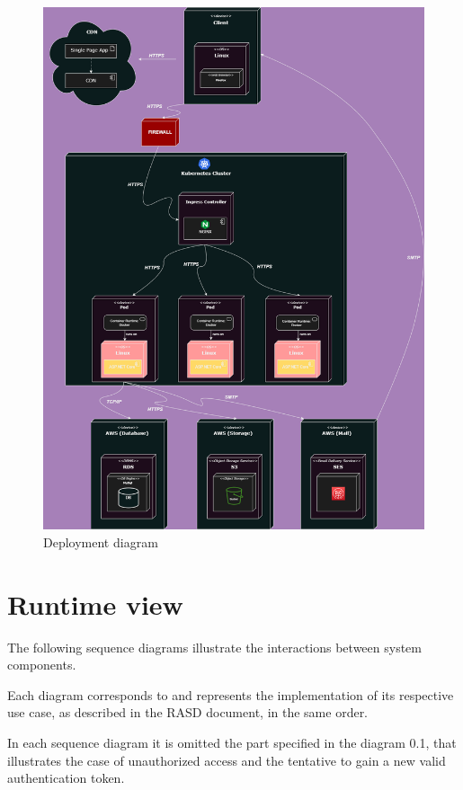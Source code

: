 \begin{figure}[!ht]
    \centering
    \includegraphics[scale=0.30]{Images/ImagesDD/deployment.png}
    \caption{Deployment diagram}
\end{figure}

\newpage


\section{Runtime view}
The following sequence diagrams illustrate the interactions between system components. 

Each diagram corresponds to and represents the implementation of its respective use case, as described in the RASD document, in the same order.

In each sequence diagram it is omitted the part specified in the diagram 0.1, that illustrates the case of unauthorized access and the tentative to gain a new valid authentication token. 

